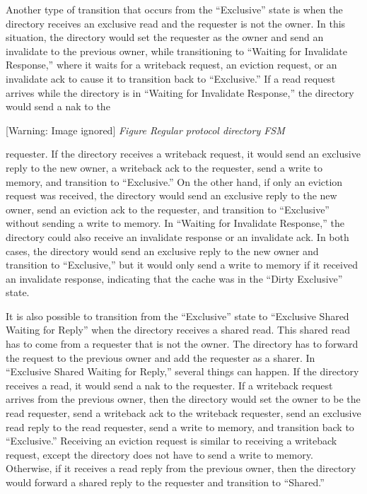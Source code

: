 \documentclass[letterpaper]{article}
\newcounter{Figure}
\renewcommand\theFigure{\arabic{Figure}}
\begin{document}
Another type of transition that occurs from the ``Exclusive'' state is when the directory receives an exclusive read and the requester is not the owner. In this situation, the directory would set the requester as the owner and send an invalidate to the previous owner, while transitioning to ``Waiting for Invalidate Response,'' where it waits for a writeback request, an eviction request, or an invalidate ack to cause it to transition back to ``Exclusive.'' If a read request arrives while the directory is in ``Waiting for Invalidate Response,'' the directory would send a nak to the \begin{minipage}{6.5in}


 [Warning: Image ignored] %
{\itshape
Figure {\theFigure\label{seq:refFigure1}} Regular protocol directory FSM}


\bigskip


\bigskip
\end{minipage} 

requester. If the directory receives a writeback request, it would send an exclusive reply to the new owner, a writeback ack to the requester, send a write to memory, and transition to ``Exclusive.'' On the other hand, if only an eviction request was received, the directory would send an exclusive reply to the new owner, send an eviction ack to the requester, and transition to ``Exclusive'' without sending a write to memory. In ``Waiting for Invalidate Response,'' the directory could also receive an invalidate response or an invalidate ack. In both cases, the directory would send an exclusive reply to the new owner and transition to ``Exclusive,'' but it would only send a write to memory if it received an invalidate response, indicating that the cache was in the ``Dirty Exclusive'' state.

It is also possible to transition from the ``Exclusive'' state to ``Exclusive Shared Waiting for Reply'' when the directory receives a shared read. This shared read has to come from a requester that is not the owner. The directory has to forward the request to the previous owner and add the requester as a sharer. In ``Exclusive Shared Waiting for Reply,'' several things can happen. If the directory receives a read, it would send a nak to the requester. If a writeback request arrives from the previous owner, then the directory would set the owner to be the read requester, send a writeback ack to the writeback requester, send an exclusive read reply to the read requester, send a write to memory, and transition back to ``Exclusive.'' Receiving an eviction request is similar to receiving a writeback request, except the directory does not have to send a write to memory. Otherwise, if it receives a read reply from the previous owner, then the directory would forward a shared reply to the requester and transition to ``Shared.''
\end{document}
